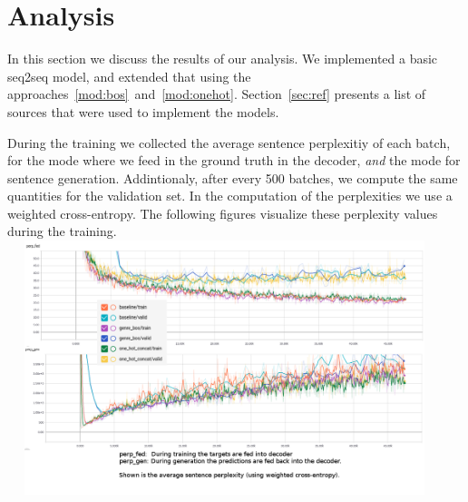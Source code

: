 \section{Analysis}
In this section we discuss the results of our analysis. We implemented a basic seq2seq model, and extended that using the approaches~\ref{mod:bos}~and~\ref{mod:onehot}. Section~\ref{sec:ref} presents a list of sources that were used to implement the models.

During the training we collected the average sentence perplexitiy of each batch, for the mode where we feed in the ground truth in the decoder, \emph{and} the mode for sentence generation. Addintionaly, after every 500 batches, we compute the same quantities for the validation set. In the computation of the perplexities we use a weighted cross-entropy.
%
The following figures visualize these perplexity values during the training.
%
\newline
%
\includegraphics[width=0.95\textwidth, height=280px]{./img/perplexity.png}
%
\newline
%
 

